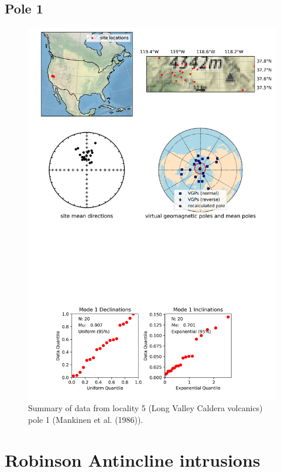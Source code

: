 \documentclass{article}
\begin{document}
\subsection{Pole 1}


\begin{figure}[H]
\centering
\includegraphics[width=5 in]{./5/1/pole_summary.png}
\caption{Summary of data from locality 5 (Long Valley Caldera volcanics) pole 1 (Mankinen et al. (1986)).}
\end{figure}

\section{Robinson Antincline intrusions}
\end{document}
